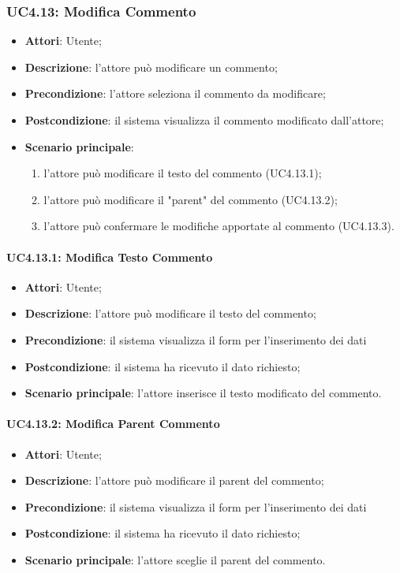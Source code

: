 \begin{itemize}
\begin{itemize}
\begin{itemize}
\begin{itemize}
\subsubsection{UC4.13: Modifica Commento}
\label{UC4.13}
\begin{itemize}
	\item \textbf{Attori}: Utente;
	\item \textbf{Descrizione}: l'attore può modificare un commento;
	\item \textbf{Precondizione}: l'attore seleziona il commento da modificare;
	\item \textbf{Postcondizione}: il sistema visualizza il commento modificato dall'attore;
	\item \textbf{Scenario principale}:
	\begin{enumerate}
		\item l'attore può modificare il testo del commento (UC4.13.1);
		\item l'attore può modificare il "parent" del commento (UC4.13.2);
		\item l'attore può confermare le modifiche apportate al commento (UC4.13.3).
	\end{enumerate}
\end{itemize}

\paragraph{UC4.13.1: Modifica Testo Commento}
\label{UC4.13.1}
\begin{itemize}
	\item \textbf{Attori}: Utente;
	\item \textbf{Descrizione}: l'attore può modificare il testo del commento;
	\item \textbf{Precondizione}: il sistema visualizza il form per l'inserimento dei dati
	\item \textbf{Postcondizione}: il sistema ha ricevuto il dato richiesto;
	\item \textbf{Scenario principale}: l'attore inserisce il testo modificato del commento.
\end{itemize}

\paragraph{UC4.13.2: Modifica Parent Commento}
\label{UC4.13.2}
\begin{itemize}
	\item \textbf{Attori}: Utente;
	\item \textbf{Descrizione}: l'attore può modificare il parent del commento;
	\item \textbf{Precondizione}: il sistema visualizza il form per l'inserimento dei dati
	\item \textbf{Postcondizione}: il sistema ha ricevuto il dato richiesto;
	\item \textbf{Scenario principale}: l'attore sceglie il parent del commento.
\end{itemize}


\end{itemize}
\end{itemize}
\end{itemize}
\end{itemize}

